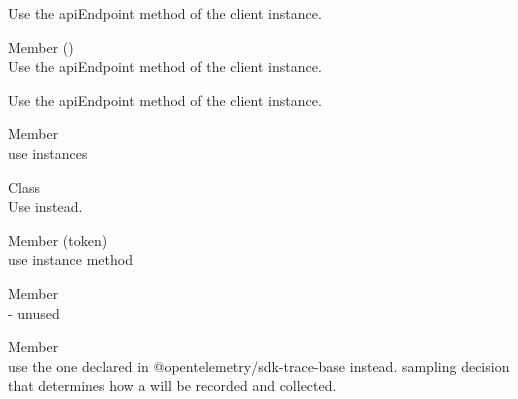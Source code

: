 \begin{DoxyRefList}
\label{deprecated__deprecated000005}%
%
Use the api\+Endpoint method of the client instance.  
\item[Member \doxylink{class_firestore_client_acc975553e49f3c894c44aff35c8a1532}{Firestore\+Client\+::service\+Path} ()]\hfill \\
\label{deprecated__deprecated000001}%
%
Use the api\+Endpoint method of the client instance. 

\label{deprecated__deprecated000004}%
%
Use the api\+Endpoint method of the client instance.  
\item[Member \doxylink{oauth2client_8js_a744e64bbe166fbb86e2c8b9f4031d559}{GOOGLE\+\_\+\+TOKEN\+\_\+\+INFO\+\_\+\+URL} ]\hfill \\
\label{deprecated__deprecated000038}%
%
use instance\textquotesingle{}s {\ttfamily {}}  
\item[Class \doxylink{class_instance_id}{Instance\+Id} ]\hfill \\
\label{deprecated__deprecated000036}%
%
Use {\ttfamily {}} instead.  
\item[Member \doxylink{class_o_auth2_client_a183c96fb132ee298ed8fa9442d3df097}{OAuth2\+Client\+::get\+Revoke\+Token\+Url} (token)]\hfill \\
\label{deprecated__deprecated000039}%
%
use instance method {\ttfamily {}}  
\item[Member \doxylink{cjs_2src_2signer_8js_a7bdc3d0aa9b1b32d3b8ca8897d21b2cf}{PATH\+\_\+\+STYLED\+\_\+\+HOST} ]\hfill \\
\label{deprecated__deprecated000018}%
%
-\/ unused  
\item[Member \doxylink{esm_2trace_2_sampling_result_8js_ae442dcc882881a03db2a9082542e7692}{Sampling\+Decision} ]\hfill \\
\label{deprecated__deprecated000032}%
%
use the one declared in @opentelemetry/sdk-\/trace-\/base instead.  sampling decision that determines how a {\ttfamily {}} will be recorded and collected. 


\end{DoxyRefList}
